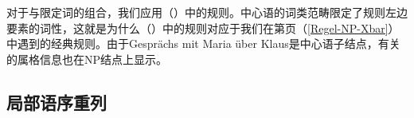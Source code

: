 \z
对于\nbarc 与限定词的组合，我们应用（）中的规则。中心语的词类范畴限定了规则左边要素的词性，这就是为什么（）中的规则对应于我们在第\pageref{Regel-NP-Xbar}页（\ref{Regel-NP-Xbar}）中遇到的经典\xbarc 规则。由于Gesprächs mit Maria über Klaus是中心语子结点，有关\nbarc 的属格信息也在NP结点上显示。

\subsection{局部语序重列}
\label{GPSG-lokale-Umstellung}\label{sec-IDLP-intro}

